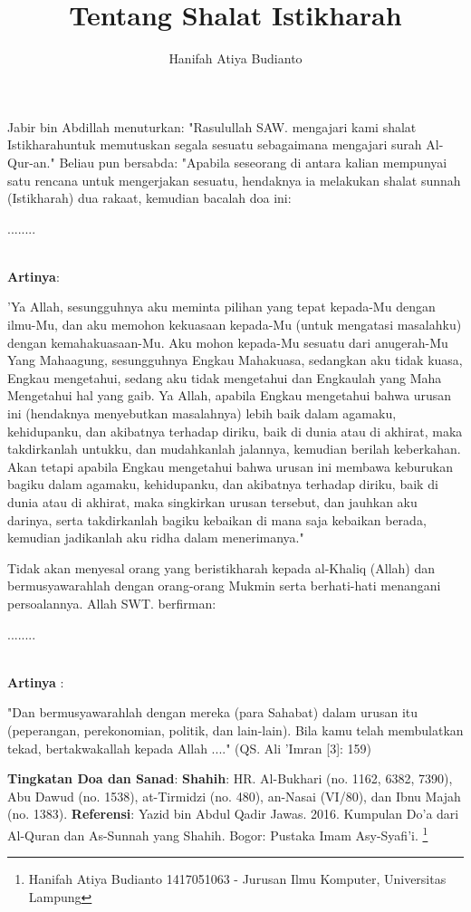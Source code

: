 \documentclass[a4paper,12pt]{article}
\title{\Large Tentang Shalat Istikharah}
\author{\calligra Hanifah Atiya Budianto}
\begin{document}
\sffamily
\maketitle 
\fullvocalize
{}
\par
\indent
Jabir bin Abdillah menuturkan: "Rasulullah SAW. mengajari kami shalat Istikharahuntuk memutuskan segala sesuatu sebagaimana mengajari  surah Al-Qur-an." Beliau pun bersabda: "Apabila seseorang di antara kalian mempunyai satu rencana untuk mengerjakan sesuatu, hendaknya ia melakukan shalat sunnah (Istikharah) dua rakaat, kemudian bacalah doa ini:\\
\begin{arabtext}
\noindent
........ \\ \\
\end{arabtext}
\noindent
\textbf{Artinya}:
\par
\indent
'Ya Allah, sesungguhnya aku meminta pilihan yang tepat kepada-Mu dengan ilmu-Mu, dan aku memohon kekuasaan kepada-Mu (untuk mengatasi masalahku) dengan kemahakuasaan-Mu. Aku mohon kepada-Mu sesuatu dari anugerah-Mu Yang Mahaagung, sesungguhnya Engkau Mahakuasa, sedangkan aku tidak kuasa, Engkau mengetahui, sedang aku tidak mengetahui dan Engkaulah yang Maha Mengetahui hal yang gaib. Ya Allah, apabila Engkau mengetahui bahwa urusan ini (hendaknya menyebutkan masalahnya) lebih baik dalam agamaku, kehidupanku, dan akibatnya terhadap diriku, baik di dunia atau di akhirat, maka takdirkanlah untukku, dan mudahkanlah jalannya, kemudian berilah keberkahan. Akan tetapi apabila Engkau mengetahui bahwa urusan ini membawa keburukan bagiku dalam agamaku, kehidupanku, dan akibatnya terhadap diriku, baik di dunia atau di akhirat, maka singkirkan urusan tersebut, dan jauhkan aku darinya, serta takdirkanlah bagiku kebaikan di mana saja kebaikan berada, kemudian jadikanlah aku ridha dalam menerimanya."\\
\par
\indent
Tidak akan menyesal orang yang beristikharah kepada al-Khaliq (Allah) dan bermusyawarahlah dengan orang-orang Mukmin serta berhati-hati menangani persoalannya. Allah SWT. berfirman:\\
\begin{arabtext}
\noindent
........ \\ \\
\end{arabtext}
\noindent
\textbf{Artinya} :
\par
\indent
"Dan bermusyawarahlah dengan mereka (para Sahabat) dalam urusan itu (peperangan, perekonomian, politik, dan lain-lain). Bila kamu telah membulatkan tekad, bertakwakallah kepada Allah ...." (QS. Ali 'Imran [3]: 159)\\
\par
\noindent
\textbf{Tingkatan Doa dan Sanad}: \textbf{Shahih}: HR. Al-Bukhari (no. 1162, 6382, 7390), Abu Dawud (no. 1538), at-Tirmidzi (no. 480), an-Nasai (VI/80), dan Ibnu Majah (no. 1383).
\textbf{Referensi}: Yazid bin Abdul Qadir Jawas. 2016. Kumpulan Do'a dari
Al-Quran dan As-Sunnah yang Shahih. Bogor: Pustaka Imam Asy-Syafi'i.
\footnote{Hanifah Atiya Budianto 1417051063 - Jurusan Ilmu Komputer,
Universitas Lampung}
\end{document}
